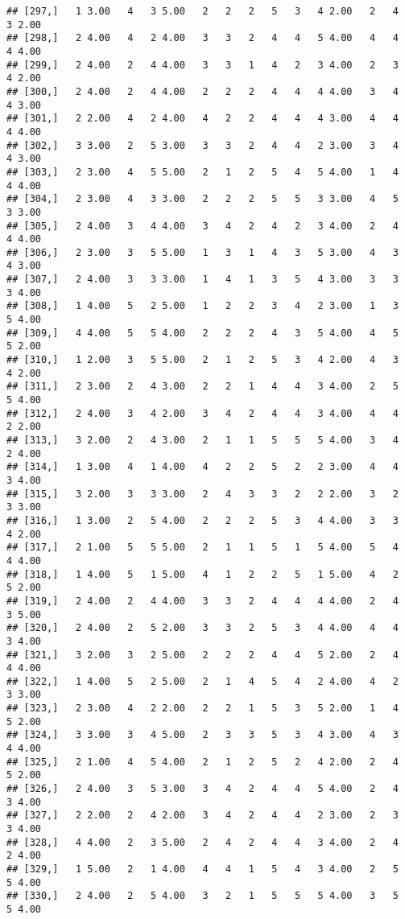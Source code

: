 \documentclass[]{article}
\begin{document}
\begin{verbatim}
## [297,]   1 3.00   4   3 5.00   2   2   2   5   3   4 2.00   2   4   3 2.00
## [298,]   2 4.00   4   2 4.00   3   3   2   4   4   5 4.00   4   4   4 4.00
## [299,]   2 4.00   2   4 4.00   3   3   1   4   2   3 4.00   2   3   4 2.00
## [300,]   2 4.00   2   4 4.00   2   2   2   4   4   4 4.00   3   4   4 3.00
## [301,]   2 2.00   4   2 4.00   4   2   2   4   4   4 3.00   4   4   4 4.00
## [302,]   3 3.00   2   5 3.00   3   3   2   4   4   2 3.00   3   4   4 3.00
## [303,]   2 3.00   4   5 5.00   2   1   2   5   4   5 4.00   1   4   4 4.00
## [304,]   2 3.00   4   3 3.00   2   2   2   5   5   3 3.00   4   5   3 3.00
## [305,]   2 4.00   3   4 4.00   3   4   2   4   2   3 4.00   2   4   4 4.00
## [306,]   2 3.00   3   5 5.00   1   3   1   4   3   5 3.00   4   3   4 3.00
## [307,]   2 4.00   3   3 3.00   1   4   1   3   5   4 3.00   3   3   3 4.00
## [308,]   1 4.00   5   2 5.00   1   2   2   3   4   2 3.00   1   3   5 4.00
## [309,]   4 4.00   5   5 4.00   2   2   2   4   3   5 4.00   4   5   5 2.00
## [310,]   1 2.00   3   5 5.00   2   1   2   5   3   4 2.00   4   3   4 2.00
## [311,]   2 3.00   2   4 3.00   2   2   1   4   4   3 4.00   2   5   5 4.00
## [312,]   2 4.00   3   4 2.00   3   4   2   4   4   3 4.00   4   4   2 2.00
## [313,]   3 2.00   2   4 3.00   2   1   1   5   5   5 4.00   3   4   2 4.00
## [314,]   1 3.00   4   1 4.00   4   2   2   5   2   2 3.00   4   4   3 4.00
## [315,]   3 2.00   3   3 3.00   2   4   3   3   2   2 2.00   3   2   3 3.00
## [316,]   1 3.00   2   5 4.00   2   2   2   5   3   4 4.00   3   3   4 2.00
## [317,]   2 1.00   5   5 5.00   2   1   1   5   1   5 4.00   5   4   4 4.00
## [318,]   1 4.00   5   1 5.00   4   1   2   2   5   1 5.00   4   2   5 2.00
## [319,]   2 4.00   2   4 4.00   3   3   2   4   4   4 4.00   2   4   3 5.00
## [320,]   2 4.00   2   5 2.00   3   3   2   5   3   4 4.00   4   4   3 4.00
## [321,]   3 2.00   3   2 5.00   2   2   2   4   4   5 2.00   2   4   4 4.00
## [322,]   1 4.00   5   2 5.00   2   1   4   5   4   2 4.00   4   2   3 3.00
## [323,]   2 3.00   4   2 2.00   2   2   1   5   3   5 2.00   1   4   5 2.00
## [324,]   3 3.00   3   4 5.00   2   3   3   5   3   4 3.00   4   3   4 4.00
## [325,]   2 1.00   4   5 4.00   2   1   2   5   2   4 2.00   2   4   5 2.00
## [326,]   2 4.00   3   5 3.00   3   4   2   4   4   5 4.00   2   4   3 4.00
## [327,]   2 2.00   2   4 2.00   3   4   2   4   4   2 3.00   2   3   3 4.00
## [328,]   4 4.00   2   3 5.00   2   4   2   4   4   3 4.00   2   4   2 4.00
## [329,]   1 5.00   2   1 4.00   4   4   1   5   4   3 4.00   2   5   5 4.00
## [330,]   2 4.00   2   5 4.00   3   2   1   5   5   5 4.00   3   5   5 4.00

\end{verbatim}
\end{document}
